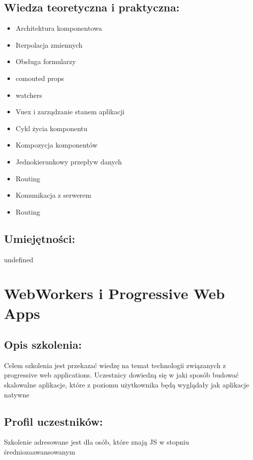 \documentclass{article}[10pt]
\begin{document}
	\subsection*{Wiedza teoretyczna i praktyczna:}
\begin{adjustwidth}{1.5cm}{}
	\begin{itemize}
		\item Architektura komponentowa
		\item Iterpolacja zmiennych
		\item Obsługa formularzy
		\item comouted props
		\item watchers
		\item Vuex i zarządzanie stanem aplikacji
		\item Cykl życia komponentu
		\item Kompozycja komponentów
		\item Jednokierunkowy przepływ danych
		\item Routing
		\item Komunikacja z serwerem
		\item Routing
	\end{itemize}
\end{adjustwidth}

	\subsection*{Umiejętności:}
\begin{adjustwidth}{2cm}{}
\justifying
	undefined
\end{adjustwidth}

\newpage


    
	\section{WebWorkers i Progressive Web Apps}

	\subsection*{Opis szkolenia:}
	\begin{adjustwidth}{2cm}{}
\justifying
		Celem szkolenia jest przekazać wiedzę na temat technologii związanych z progressive web applications. Uczestnicy dowiedzą się w jaki sposób budować skalowalne aplikacje, które z poziomu użytkownika będą wyglądały jak aplikacje natywne
	\end{adjustwidth}
	\subsection*{Profil uczestników:}
\begin{adjustwidth}{2cm}{}
\justifying
	Szkolenie adresowane jest dla osób, które znają JS w stopniu średniozaawansowanym
\end{adjustwidth}
\end{document}

